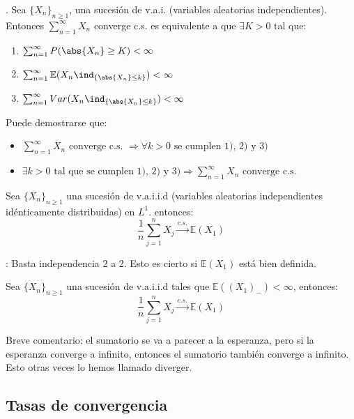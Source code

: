 \documentclass{apuntes}
\begin{document}
\begin{theorem}.
Sea $\{X_n\}_{n\geq 1}$, una sucesión de v.a.i. (variables aleatorias independientes). Entonces $\sum_{n=1}^{\infty} X_n$ converge c.s. es equivalente a que $\exists K >0$ tal que:
\begin{enumerate}
\item $\sum_{n=1}^{\infty} P(\abs{X_n}\geq K)<\infty$
\item $\sum_{n=1}^{\infty} \mathbb{E}(X_n \ind_{\{\abs{X_n}\leq k\}}) <\infty$
\item $\sum_{n=1}^{\infty} Var(X_n \ind_{\{\abs{X_n}\leq k\}}) <\infty$
\end{enumerate}
Puede demostrarse que:
\begin{itemize}
\item $\sum_{n=1}^{\infty} X_n \text{ converge c.s. }  \Rightarrow \forall k>0 \text{ se cumplen 1), 2) y 3)}$
\item $\exists k>0 \text{ tal que se cumplen 1), 2) y 3)} \Rightarrow \sum_{n=1}^{\infty} X_n \text{ converge c.s. } $
\end{itemize}
\end{theorem}

\begin{theorem}
Sea $\{X_n\}_{n\geq 1}$ una sucesión de v.a.i.i.d (variables aleatorias independientes idénticamente distribuidas) en $L^1$. entonces:
\[
\frac{1}{n}\sum_{j=1}^{n}X_j \stackrel{c.s.}{\rightarrow} \mathbb{E}(X_1)
\]


\obs: Basta independencia 2 a 2. Esto es cierto si $\mathbb{E}(X_1)$ está bien definida.
\end{theorem}

\begin{theorem}
Sea $\{X_n\}_{n \geq 1}$ una sucesión de v.a.i.i.d tales que $\mathbb{E}((X_1)_-) < \infty$, entonces:
\[
\frac{1}{n}\sum_{j=1}^{n}X_j \stackrel{c.s.}{\rightarrow} \mathbb{E}(X_1)
\]

Breve comentario: el sumatorio se va a parecer a la esperanza, pero si la esperanza converge a infinito, entonces el sumatorio también converge a infinito. Esto otras veces lo hemos llamado diverger. 

\end{theorem}

\subsection{Tasas de convergencia}
\end{document}
